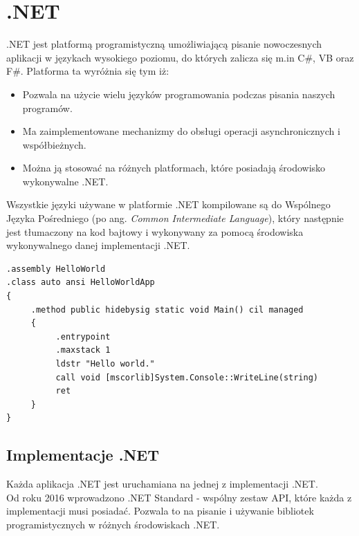 


{\let\cleardoublepage\relax \chapter{.NET}}


.NET jest platformą programistyczną umożliwiającą pisanie nowoczesnych aplikacji w językach wysokiego poziomu, do których zalicza się m.in C\#, VB oraz F\#. Platforma ta wyróżnia się tym iż:
\begin{itemize}
	\item Pozwala na użycie wielu języków programowania podczas pisania naszych programów.
	\item Ma zaimplementowane mechanizmy do obsługi operacji asynchronicznych i współbieżnych.
	\item Można ją stosować na różnych platformach, które posiadają środowisko wykonywalne .NET.
\end{itemize}
Wszystkie języki używane w platformie .NET kompilowane są do Wspólnego Języka Pośredniego (po ang. \textit{Common Intermediate Language}), który następnie jest tłumaczony na kod bajtowy i wykonywany za pomocą środowiska wykonywalnego danej implementacji .NET.

\begin{lstlisting}[frame=single, numbers=none,captionpos=b, 
caption={Przykładowy kod aplikacji "Hello World" w języku CIL}]
.assembly HelloWorld
.class auto ansi HelloWorldApp
{
     .method public hidebysig static void Main() cil managed
     {
          .entrypoint
          .maxstack 1
          ldstr "Hello world."
          call void [mscorlib]System.Console::WriteLine(string)
          ret
     }
}
\end{lstlisting}


\section{Implementacje .NET}

Każda aplikacja .NET jest uruchamiana na jednej z implementacji .NET. \\
Od roku 2016 wprowadzono .NET Standard - wspólny zestaw API, które każda z implementacji musi posiadać. Pozwala to na pisanie i używanie bibliotek programistycznych w różnych środowiskach .NET.

